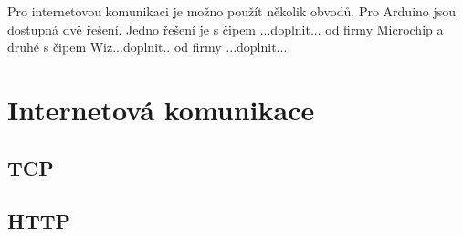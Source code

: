 Pro internetovou komunikaci je možno použít několik obvodů.  Pro Arduino jsou dostupná dvě řešení.  Jedno řešení je s čipem ...doplnit... od firmy Microchip a druhé s čipem Wiz...doplnit.. od firmy ...doplnit...

\section{Internetová komunikace}

\subsection{TCP}

\subsection{HTTP}



